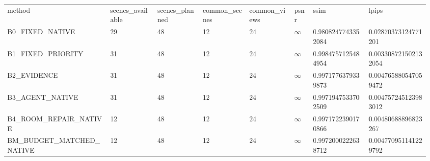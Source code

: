 \begin{tabular}{llllllll}
method & scenes\_available & scenes\_planned & common\_scenes & common\_views & psnr & ssim & lpips \\
B0\_FIXED\_NATIVE & 29 & 48 & 12 & 24 & $\infty$ & 0.9808247743352084 & 0.02870373124771201 \\
B1\_FIXED\_PRIORITY & 31 & 48 & 12 & 24 & $\infty$ & 0.9984757125484954 & 0.003308721502132054 \\
B2\_EVIDENCE & 31 & 48 & 12 & 24 & $\infty$ & 0.9971776379339873 & 0.004765880547059472 \\
B3\_AGENT\_NATIVE & 31 & 48 & 12 & 24 & $\infty$ & 0.9971947533702509 & 0.004757245123983012 \\
B4\_ROOM\_REPAIR\_NATIVE & 12 & 48 & 12 & 24 & $\infty$ & 0.9971722390170866 & 0.00480688896823267 \\
BM\_BUDGET\_MATCHED\_NATIVE & 12 & 48 & 12 & 24 & $\infty$ & 0.9972000222638712 & 0.004770951141229792 \\
\end{tabular}
